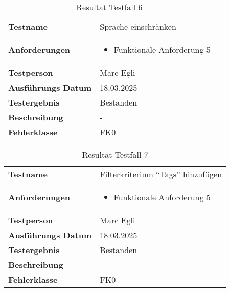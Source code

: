 \begin{table}[H]
    \begin{tabular}{|L{0.3\textwidth}|L{0.65\textwidth}|}
        \hline
           \\[10pt]
        \hline
        \textbf{Testname} & Sprache einschränken \\
        \hline
        \textbf{Anforderungen} & 
        \begin{itemize}
            \item Funktionale Anforderung 5
        \end{itemize} \\
        \hline
        \textbf{Testperson} & Marc Egli \\
        \hline
        \textbf{Ausführungs Datum} & 18.03.2025 \\
        \hline
        \textbf{Testergebnis} & Bestanden \\
        \hline
        \textbf{Beschreibung} & - \\ 
        \hline
        \textbf{Fehlerklasse} & FK0 \\ 
        \hline
    \end{tabular}
    \caption{Resultat Testfall 6}
\end{table}

\begin{table}[H]
    \begin{tabular}{|L{0.3\textwidth}|L{0.65\textwidth}|}
        \hline
           \\[10pt]
        \hline
        \textbf{Testname} & Filterkriterium ``Tags'' hinzufügen \\
        \hline
        \textbf{Anforderungen} & 
        \begin{itemize}
            \item Funktionale Anforderung 5
        \end{itemize} \\
        \hline
        \textbf{Testperson} & Marc Egli \\
        \hline
        \textbf{Ausführungs Datum} & 18.03.2025 \\
        \hline
        \textbf{Testergebnis} & Bestanden \\
        \hline
        \textbf{Beschreibung} & - \\ 
        \hline
        \textbf{Fehlerklasse} & FK0 \\ 
        \hline
    \end{tabular}
    \caption{Resultat Testfall 7}
\end{table}

